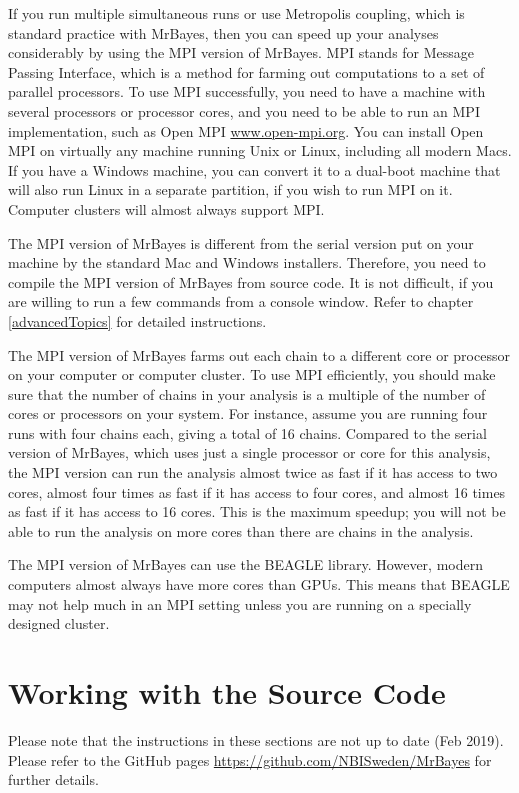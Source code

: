 \documentclass[12pt]{book}
\begin{document}
If you run multiple simultaneous runs or use Metropolis coupling, which is standard practice with
MrBayes, then you can speed up your analyses considerably by using the MPI version of MrBayes. MPI
stands for Message Passing Interface, which is a method for farming out computations to a set of
parallel processors. To use MPI successfully, you need to have a machine with several processors
or processor cores, and you need to be able to run an MPI implementation, such as Open MPI
\url{www.open-mpi.org}. You can install Open MPI on virtually any machine running Unix or Linux,
including all modern Macs. If you have a Windows machine, you can convert it to a dual-boot machine
that will also run Linux in a separate partition, if you wish to run MPI on it. Computer clusters
will almost always support MPI.

The MPI version of MrBayes is different from the serial version put on your machine by the standard
Mac and Windows installers. Therefore, you need to compile the MPI version of MrBayes from source
code. It is not difficult, if you are willing to run a few commands from a console window. Refer to
chapter \ref{advancedTopics} for detailed instructions.

The MPI version of MrBayes farms out each chain to a different core or processor on your computer
or computer cluster. To use MPI efficiently, you should make sure that the number of chains in your
analysis is a multiple of the number of cores or processors on your system. For instance, assume
you are running four runs with four chains each, giving a total of 16 chains. Compared to the
serial version of MrBayes, which uses just a single processor or core for this analysis, the MPI
version can run the analysis almost twice as fast if it has access to two cores, almost four times
as fast if it has access to four cores, and almost 16 times as fast if it has access to 16 cores.
This is the maximum speedup; you will not be able to run the analysis on more cores than there are
chains in the analysis.

The MPI version of MrBayes can use the BEAGLE library. However, modern computers almost always have
more cores than GPUs. This means that BEAGLE may not help much in an MPI setting unless you are
running on a specially designed cluster.


\section{Working with the Source Code}
\vspace{5 pt}
{\large Please note that the instructions in these sections are not up to date
(Feb 2019). Please refer to the GitHub pages \url{https://github.com/NBISweden/MrBayes}
for further details.}
\vspace{5 pt}
\end{document}
